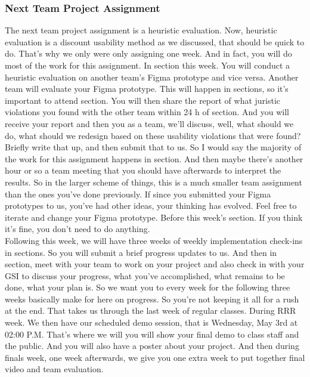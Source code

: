 \subsubsection{Next Team Project Assignment}
The next team project assignment is a heuristic evaluation. Now, heuristic evaluation is a discount usability method as we discussed, that should be quick to do. That's why we only were only assigning one week. And in fact, you will do most of the work for this assignment. In section this week. You will conduct a heuristic evaluation on another team's Figma prototype and vice versa. Another team will evaluate your Figma prototype. This will happen in sections, so it's important to attend section. You will then share the report of what juristic violations you found with the other team within 24 h of section. And you will receive your report and then you as a team, we'll discuss, well, what should we do, what should we redesign based on these usability violations that were found? Briefly write that up, and then submit that to us. So I would say the majority of the work for this assignment happens in section. And then maybe there's another hour or so a team meeting that you should have afterwards to interpret the results. So in the larger scheme of things, this is a much smaller team assignment than the ones you've done previously. If since you submitted your Figma prototypes to us, you've had other ideas, your thinking has evolved. Feel free to iterate and change your Figma prototype. Before this week's section. If you think it's fine, you don't need to do anything. \\
Following this week, we will have three weeks of weekly implementation check-ins in sections. So you will submit a brief progress updates to us. And then in section, meet with your team to work on your project and also check in with your GSI to discuss your progress, what you've accomplished, what remains to be done, what your plan is. So we want you to every week for the following three weeks basically make for here on progress. So you're not keeping it all for a rush at the end. That takes us through the last week of regular classes. During RRR week. We then have our scheduled demo session, that is Wednesday, May 3rd at 02:00 P.M. That's where we will you will show your final demo to class staff and the public. And you will also have a poster about your project. And then during finals week, one week afterwards, we give you one extra week to put together final video and team evaluation. 

